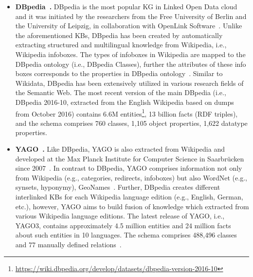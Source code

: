 \begin{itemize}
\item \textbf{DBpedia~\cite{DBLP:conf/semweb/AuerBKLCI07}.} DBpedia is the most popular KG in Linked Open Data cloud and it was initiated by the researchers from the Free University of Berlin and the University of Leipzig, in collaboration with OpenLink Software~\cite{farber2015comparative}. Unlike the aforementioned KBs, DBpedia has been created by automatically extracting structured and multilingual knowledge from Wikipedia, i.e., Wikipedia infoboxes. The types of infoboxes in Wikipedia are mapped to the DBpedia ontology (i.e., DBpedia Classes), further the attributes of these info boxes corresponds to the properties in DBpedia ontology~\cite{DBLP:journals/semweb/Paulheim17}. Similar to Wikidata, DBpedia has been extensively utilized in various research fields of the Semantic Web. The most recent version of the main DBpedia (i.e., DBpedia 2016-10, extracted from the English Wikipedia based on dumps from October 2016) contains 6.6M entities\footnote{\url{https://wiki.dbpedia.org/develop/datasets/dbpedia-version-2016-10}}, 13 billion facts (RDF triples), and the schema comprises 760 classes, 1,105 object properties, 1,622 datatype properties.\\

\item \textbf{YAGO~\cite{suchanek2007yago}.} Like DBpedia, YAGO is also extracted from Wikipedia and developed at the Max Planck Institute for Computer Science in Saarbrücken since 2007~\cite{farber2015comparative}. In contrast to DBpedia, YAGO comprises information not only from Wikipedia (e.g., categories, redirects, infoboxes) but also WordNet (e.g., synsets, hyponymy), GeoNames~\cite{farber2015comparative,fabian2007yago}. Further, DBpedia creates different interlinked KBs for each Wikipedia language edition (e.g., English, German, etc.), however, YAGO aims to build fusion of knowledge which extracted from various Wikipedia language editions. The latest release of YAGO, i.e., YAGO3, contains approximately 4.5 million entities and 24 million facts about such  entities  in  10  languages.   The  schema  comprises  488,496  classes  and  77 manually defined relations~\cite{DBLP:conf/cidr/MahdisoltaniBS15}.\\
 

\end{itemize}
